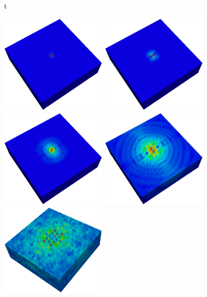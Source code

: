 \begin{figure}{t}
\begin{center}
\includegraphics[width=2in,angle=270]{Wavet0.eps}
\includegraphics[width=2in,angle=270]{Wavet1.eps}
\includegraphics[width=2in,angle=270]{Wavet3.eps}
\includegraphics[width=2in,angle=270]{Wavet10.eps}
\includegraphics[width=2in,angle=270]{Wavet30.eps}

\end{center}
\end{figure}
